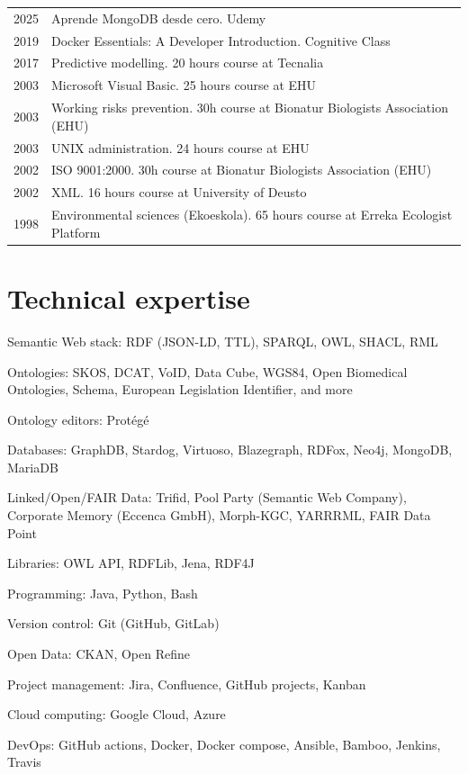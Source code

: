 \documentclass[11pt,fullpage]{article}
\renewenvironment{itemize}{
  \begin{list}{}{
    \setlength{\leftmargin}{1.5em}
  }
}{
  \end{list}
}
\begin{document}
\begin{longtable}{p{0.5in}|p{5.5in}}
  2025 & Aprende MongoDB desde cero. Udemy \\
  2019 & Docker Essentials: A Developer Introduction. Cognitive Class \\ %
  2017 & Predictive modelling. 20 hours course at Tecnalia \\
  2003 & Microsoft Visual Basic. 25 hours course at EHU \\
  2003 & Working risks prevention. 30h course at Bionatur Biologists Association (EHU) \\
  2003 & UNIX administration. 24 hours course at EHU \\
  2002 & ISO 9001:2000. 30h course at Bionatur Biologists Association (EHU) \\
  2002 & XML. 16 hours course at University of Deusto \\
  1998 & Environmental sciences (Ekoeskola). 65 hours course at Erreka Ecologist Platform \\
\end{longtable}

\section*{Technical expertise}

\begin{itemize}
  \item Semantic Web stack: RDF (JSON-LD, TTL), SPARQL, OWL, SHACL, RML
  \item Ontologies: SKOS, DCAT, VoID, Data Cube, WGS84, Open Biomedical Ontologies, Schema, European Legislation Identifier, and more
  \item Ontology editors: Prot\'eg\'e 
  \item Databases: GraphDB, Stardog, Virtuoso, Blazegraph, RDFox, Neo4j, 
  MongoDB,
  MariaDB
  \item Linked/Open/FAIR Data: Trifid, Pool Party (Semantic Web Company), Corporate Memory (Eccenca GmbH), Morph-KGC, YARRRML, FAIR Data Point
  \item Libraries: OWL API, RDFLib, Jena, RDF4J
  \item Programming: Java, Python, Bash
  \item Version control: Git (GitHub, GitLab)
  \item Open Data: CKAN, Open Refine
  \item Project management: Jira, Confluence, GitHub projects, Kanban
  \item Cloud computing: Google Cloud, Azure %
  \item DevOps: GitHub actions, Docker, Docker compose, Ansible, Bamboo, Jenkins, Travis
\end{itemize}
\end{document}
